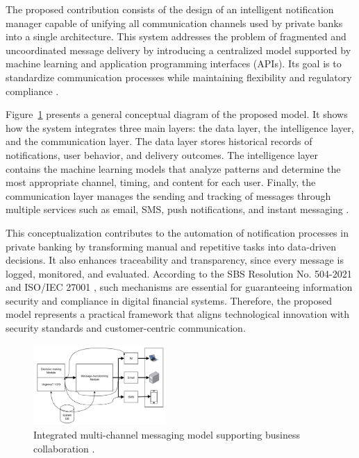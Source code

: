\documentclass[conference]{IEEEtran}
\begin{document}
The proposed contribution consists of the design of an intelligent notification manager capable of unifying all communication channels used by private banks into a single architecture. This system addresses the problem of fragmented and uncoordinated message delivery by introducing a centralized model supported by machine learning and application programming interfaces (APIs). Its goal is to standardize communication processes while maintaining flexibility and regulatory compliance \cite{rahimi2021,torres2020}.

Figure~\ref{fig:liu2011} presents a general conceptual diagram of the proposed model. It shows how the system integrates three main layers: the data layer, the intelligence layer, and the communication layer. The data layer stores historical records of notifications, user behavior, and delivery outcomes. The intelligence layer contains the machine learning models that analyze patterns and determine the most appropriate channel, timing, and content for each user. Finally, the communication layer manages the sending and tracking of messages through multiple services such as email, SMS, push notifications, and instant messaging \cite{liang2011}.

This conceptualization contributes to the automation of notification processes in private banking by transforming manual and repetitive tasks into data-driven decisions. It also enhances traceability and transparency, since every message is logged, monitored, and evaluated. According to the SBS Resolution No. 504-2021 \cite{sbs2021} and ISO/IEC 27001 \cite{iso27001}, such mechanisms are essential for guaranteeing information security and compliance in digital financial systems. Therefore, the proposed model represents a practical framework that aligns technological innovation with security standards and customer-centric communication.

\begin{figure}[htbp]
  \centering
  \includegraphics[width=0.45\textwidth]{liu2011-model.jpg}
  \caption{Integrated multi-channel messaging model supporting business collaboration \cite{liu2011}.}
  \label{fig:liu2011}
\end{figure}



\end{document}
